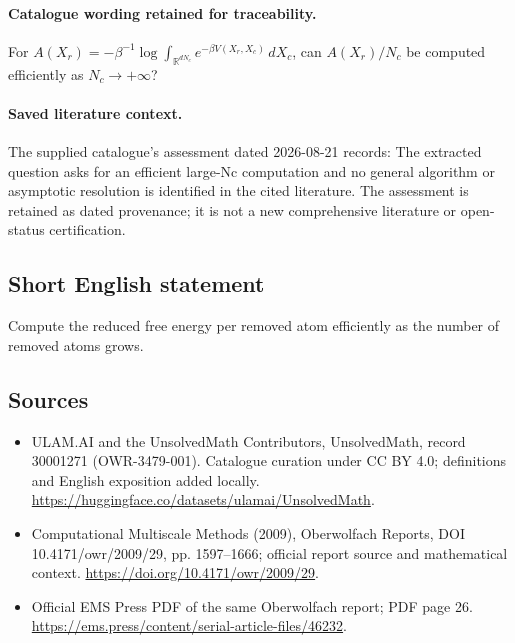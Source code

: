 \documentclass[11pt]{article}
\begin{document}
\paragraph{Catalogue wording retained for traceability.}
For $A(X_r)=-\beta^{-1}\log\int_{\mathbb R^{dN_c}}e^{-\beta V(X_r,X_c)}\,dX_c$, can $A(X_r)/N_c$ be computed efficiently as $N_c\to+\infty$?

\paragraph{Saved literature context.} The supplied catalogue's assessment dated 2026-08-21 records: The extracted question asks for an efficient large-Nc computation and no general algorithm or asymptotic resolution is identified in the cited literature. The assessment is retained as dated provenance; it is not a new comprehensive literature or open-status certification.
\subsection{Short English statement}
Compute the reduced free energy per removed atom efficiently as the number of removed atoms grows.
\subsection{Sources}
\begin{itemize}
\item[\hypertarget{source:30001271:1}{S1}] ULAM.AI and the UnsolvedMath Contributors, UnsolvedMath, record 30001271 (OWR-3479-001). Catalogue curation under CC BY 4.0; definitions and English exposition added locally.
\url{https://huggingface.co/datasets/ulamai/UnsolvedMath}.
\item[\hypertarget{source:30001271:2}{S2}] Computational Multiscale Methods (2009), Oberwolfach Reports, DOI 10.4171/owr/2009/29, pp. 1597--1666; official report source and mathematical context.
\url{https://doi.org/10.4171/owr/2009/29}.
\item[\hypertarget{source:30001271:3}{S3}] Official EMS Press PDF of the same Oberwolfach report; PDF page 26.
\url{https://ems.press/content/serial-article-files/46232}.
\end{itemize}
\label{end:30001271}
\end{document}
